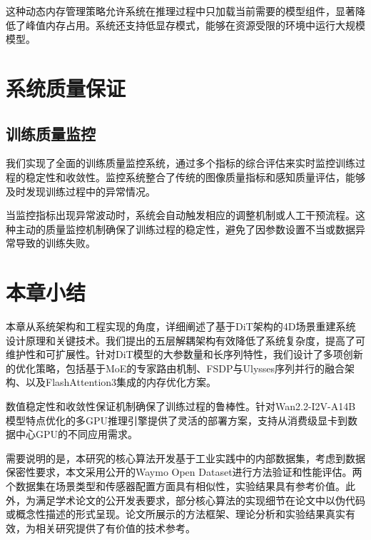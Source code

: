 这种动态内存管理策略允许系统在推理过程中只加载当前需要的模型组件，显著降低了峰值内存占用。系统还支持低显存模式，能够在资源受限的环境中运行大规模模型。

\section{系统质量保证}

\subsection{训练质量监控}

我们实现了全面的训练质量监控系统，通过多个指标的综合评估来实时监控训练过程的稳定性和收敛性。监控系统整合了传统的图像质量指标和感知质量评估，能够及时发现训练过程中的异常情况。

当监控指标出现异常波动时，系统会自动触发相应的调整机制或人工干预流程。这种主动的质量监控机制确保了训练过程的稳定性，避免了因参数设置不当或数据异常导致的训练失败。

\section{本章小结}

本章从系统架构和工程实现的角度，详细阐述了基于DiT架构的4D场景重建系统设计原理和关键技术。我们提出的五层解耦架构有效降低了系统复杂度，提高了可维护性和可扩展性。针对DiT模型的大参数量和长序列特性，我们设计了多项创新的优化策略，包括基于MoE的专家路由机制、FSDP与Ulysses序列并行的融合架构、以及FlashAttention3集成的内存优化方案。

数值稳定性和收敛性保证机制确保了训练过程的鲁棒性。针对Wan2.2-I2V-A14B模型特点优化的多GPU推理引擎提供了灵活的部署方案，支持从消费级显卡到数据中心GPU的不同应用需求。

需要说明的是，本研究的核心算法开发基于工业实践中的内部数据集，考虑到数据保密性要求，本文采用公开的Waymo Open Dataset进行方法验证和性能评估。两个数据集在场景类型和传感器配置方面具有相似性，实验结果具有参考价值。此外，为满足学术论文的公开发表要求，部分核心算法的实现细节在论文中以伪代码或概念性描述的形式呈现。论文所展示的方法框架、理论分析和实验结果真实有效，为相关研究提供了有价值的技术参考。
